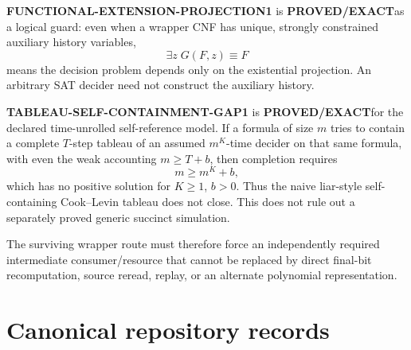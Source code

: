 \documentclass[11pt]{article}
\newcommand{\statusproved}{\textcolor{proved}{\textbf{PROVED/EXACT}}}
\theoremstyle{plain}
\theoremstyle{definition}
\theoremstyle{remark}
\begin{document}
\textbf{FUNCTIONAL-EXTENSION-PROJECTION1} is \statusproved as a logical guard:
even when a wrapper CNF has unique, strongly constrained auxiliary history
variables,
\[
\exists z\;G(F,z)\equiv F
\]
means the decision problem depends only on the existential projection.  An
arbitrary SAT decider need not construct the auxiliary history.

\textbf{TABLEAU-SELF-CONTAINMENT-GAP1} is \statusproved for the declared
time-unrolled self-reference model.  If a formula of size \(m\) tries to
contain a complete \(T\)-step tableau of an assumed \(m^K\)-time decider on
that same formula, with even the weak accounting \(m\ge T+b\), then completion
requires
\[
m\ge m^K+b,
\]
which has no positive solution for \(K\ge1\), \(b>0\).  Thus the naive
liar-style self-containing Cook--Levin tableau does not close.  This does not
rule out a separately proved generic succinct simulation.

The surviving wrapper route must therefore force an independently required
intermediate consumer/resource that cannot be replaced by direct final-bit
recomputation, source reread, replay, or an alternate polynomial
representation.


\section{Canonical repository records}
\end{document}
